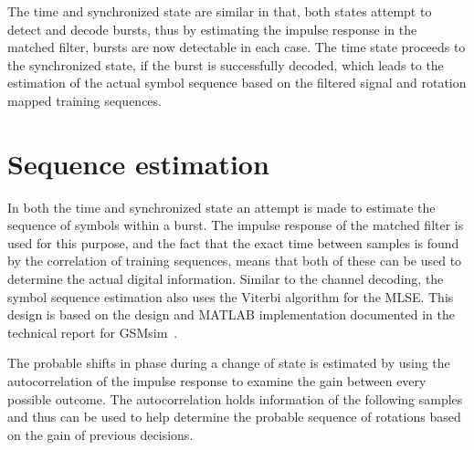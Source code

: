 The time and synchronized state are similar in that, both states
attempt to detect and decode bursts, thus by estimating the impulse
response in the matched filter, bursts are now detectable in each
case. The time state proceeds to the synchronized state, if the burst
is successfully decoded, which leads to the estimation of the actual
symbol sequence based on the filtered signal and rotation mapped
training sequences.

\section{Sequence estimation}
In both the time and synchronized state an attempt is made to estimate
the sequence of symbols within a burst. The impulse response of the
matched filter is used for this purpose, and the fact that the exact
time between samples is found by the correlation of training
sequences, means that both of these can be used to determine the
actual digital information. Similar to the channel decoding, the
symbol sequence estimation also uses the Viterbi algorithm for the
\gls{MLSE}. This design is based on the design and MATLAB
implementation documented in the technical report for
GSMsim~\cite{ekstr1997a}.

The probable shifts in phase during a change of state is estimated by
using the autocorrelation of the impulse response to examine the gain
between every possible outcome. The autocorrelation holds information
of the following samples and thus can be used to help determine the
probable sequence of rotations based on the gain of previous
decisions.

